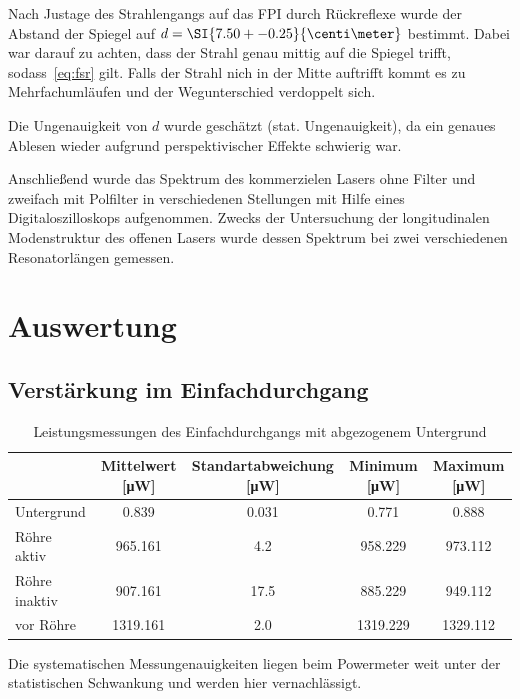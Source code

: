 \documentclass[slug=GL, room=HZDR\ Dresden/Rossendorf\,\ Geb.\ 620/123, supervisor=Tim\ Ziegler]{../../Lab_Report_LaTeX/lab_report}
\begin{document}
Nach Justage des Strahlengangs auf das FPI durch R\"uckreflexe wurde
der Abstand der Spiegel auf \(d=\SI{7.50+-0.25}{\centi\meter}\)
bestimmt. Dabei war darauf zu achten, dass der Strahl genau mittig auf
die Spiegel trifft, sodass~\ref{eq:fsr} gilt. Falls der Strahl nich in
der Mitte auftrifft kommt es zu Mehrfachuml\"aufen und der
Wegunterschied verdoppelt sich.

Die Ungenauigkeit von \(d\) wurde gesch\"atzt (stat. Ungenauigkeit),
da ein genaues Ablesen wieder aufgrund perspektivischer Effekte
schwierig war.

Anschlie\ss{}end wurde das Spektrum des kommerzielen Lasers ohne
Filter und zweifach mit Polfilter in verschiedenen Stellungen mit Hilfe
eines Digitaloszilloskops aufgenommen. Zwecks der Untersuchung der
longitudinalen Modenstruktur des offenen Lasers wurde dessen Spektrum
bei zwei verschiedenen Resonatorl\"angen gemessen.

\section{Auswertung}
\label{sec:auswertung}

\subsection{Verst\"arkung im Einfachdurchgang}
\label{sec:ausweinf}

\begin{table}[h]
  \begin{tabular}{l|SSSS}
    \toprule
    & {Mittelwert [\si{\micro\watt}]} & {Standartabweichung
                                      [\si{\micro\watt}]} & {Minimum
                                                            [\si{\micro\watt}]}
    & {Maximum [\si{\micro\watt}]} \\
    \midrule
    Untergrund & 0.839 & 0.031 & 0.771 & 0.888 \\
    R\"ohre aktiv & 965.161  & 4.2  & 958.229  & 973.112  \\
    R\"ohre inaktiv & 907.161  & 17.5 & 885.229  & 949.112  \\
    vor R\"ohre & 1319.161 & 2.0  & 1319.229 & 1329.112 \\
    \bottomrule
  \end{tabular}
  \caption{Leistungsmessungen des Einfachdurchgangs mit abgezogenem Untergrund}
  \label{tab:leistungeinfach}
\end{table}

Die systematischen Messungenauigkeiten liegen beim Powermeter weit
unter der statistischen Schwankung und werden hier vernachl\"assigt.
\end{document}

